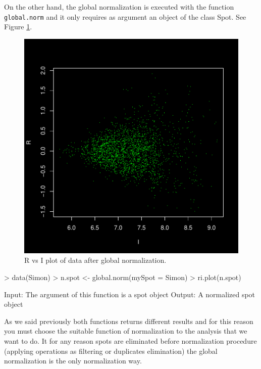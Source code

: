 \documentclass[12pt]{article}
\begin{document}
On the other hand, the global normalization is executed with the function \texttt{global.norm} and it only requires as argument an object of the class Spot. See Figure \ref{fig9}.

\begin{figure}[h]
\begin{center}
\includegraphics{example-genArise-011}
\caption{R vs I plot of data after global normalization. \label{fig9}}
\end{center}
\end{figure}
\begin{Scode}
> data(Simon)
> n.spot <- global.norm(mySpot = Simon)
> ri.plot(n.spot)
\end{Scode}
\begin{Soutput}
Input: The argument of this function is a spot object
Output: A normalized spot object
\end{Soutput}

As we said previously both functions returns different results and for this reason you must choose the suitable function of normalization to the analysis that we want to do. It for any reason spots are eliminated before normalization procedure (applying operations as filtering or duplicates elimination) the global normalization is the only normalization way.\\
\end{document}
